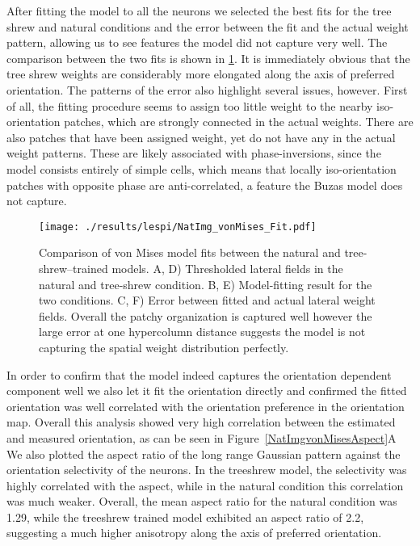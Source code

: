 After fitting the model to all the neurons we selected the best fits
for the tree shrew and natural conditions and the error between the
fit and the actual weight pattern, allowing us to see features the
model did not capture very well. The comparison between the two fits
is shown in \ref{NatImgvonMises}. It is immediately obvious that the
tree shrew weights are considerably more elongated along the axis of
preferred orientation. The patterns of the error also highlight
several issues, however.  First of all, the fitting procedure seems to
assign too little weight to the nearby iso-orientation patches, which
are strongly connected in the actual weights. There are also patches
that have been assigned weight, yet do not have any in the actual
weight patterns. These are likely associated with phase-inversions,
since the model consists entirely of simple cells, which means that
locally iso-orientation patches with opposite phase are
anti-correlated, a feature the Buzas model does not capture.

\begin{figure}
	\centering
        \texttt{[image: ./results/lespi/NatImg\_vonMises\_Fit.pdf]}
	\caption[Comparison of \cite{Buzas2006} von Mises model fit
      between the natural and treeshrew trained models.]{Comparison of
      \cite{Buzas2006} von Mises model fits between the natural and
      tree-shrew--trained models. A, D) Thresholded lateral fields in
      the natural and tree-shrew condition. B, E) Model-fitting result
      for the two conditions. C, F) Error between fitted and actual
      lateral weight fields. Overall the patchy organization is
      captured well however the large error at one hypercolumn
      distance suggests the model is not capturing the spatial weight
      distribution perfectly.}
	\label{NatImgvonMises}
\end{figure}

In order to confirm that the model indeed captures the orientation
dependent component well we also let it fit the orientation directly
and confirmed the fitted orientation was well correlated with the
orientation preference in the orientation map. Overall this analysis
showed very high correlation between the estimated and measured
orientation, as can be seen in Figure~\ref{NatImgvonMisesAspect}A We
also plotted the aspect ratio of the long range Gaussian pattern
against the orientation selectivity of the neurons. In the treeshrew
model, the selectivity was highly correlated with the aspect, while in
the natural condition this correlation was much weaker. Overall, the
mean aspect ratio for the natural condition was 1.29, while the
treeshrew trained model exhibited an aspect ratio of 2.2, suggesting a
much higher anisotropy along the axis of preferred orientation.


